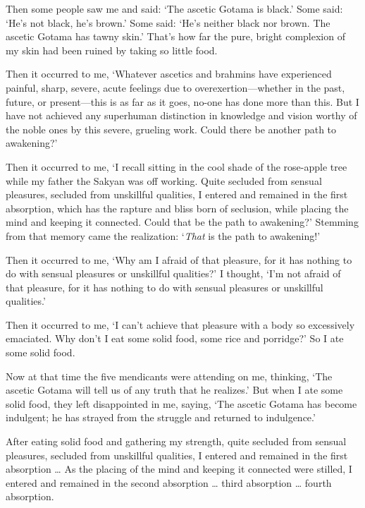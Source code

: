 \documentclass[12pt,openany]{book}%
\begin{document}
Then some people saw me and said: ‘The ascetic Gotama is black.’ Some said: ‘He’s not black, he’s brown.’ Some said: ‘He’s neither black nor brown. The ascetic Gotama has tawny skin.’ That’s how far the pure, bright complexion of my skin had been ruined by taking so little food. 

Then it occurred to me, ‘Whatever ascetics and brahmins have experienced painful, sharp, severe, acute feelings due to overexertion—whether in the past, future, or present—this is as far as it goes, no-one has done more than this. But I have not achieved any superhuman distinction in knowledge and vision worthy of the noble ones by this severe, grueling work. Could there be another path to awakening?’ 

Then it occurred to me, ‘I recall sitting in the cool shade of the rose-apple tree while my father the Sakyan was off working. Quite secluded from sensual pleasures, secluded from unskillful qualities, I entered and remained in the first absorption, which has the rapture and bliss born of seclusion, while placing the mind and keeping it connected. Could that be the path to awakening?’ Stemming from that memory came the realization: ‘\emph{That} is the path to awakening!’ 

Then it occurred to me, ‘Why am I afraid of that pleasure, for it has nothing to do with sensual pleasures or unskillful qualities?’ I thought, ‘I’m not afraid of that pleasure, for it has nothing to do with sensual pleasures or unskillful qualities.’ 

Then it occurred to me, ‘I can’t achieve that pleasure with a body so excessively emaciated. Why don’t I eat some solid food, some rice and porridge?’ So I ate some solid food. 

Now at that time the five mendicants were attending on me, thinking, ‘The ascetic Gotama will tell us of any truth that he realizes.’ But when I ate some solid food, they left disappointed in me, saying, ‘The ascetic Gotama has become indulgent; he has strayed from the struggle and returned to indulgence.’ 

After eating solid food and gathering my strength, quite secluded from sensual pleasures, secluded from unskillful qualities, I entered and remained in the first absorption … As the placing of the mind and keeping it connected were stilled, I entered and remained in the second absorption … third absorption … fourth absorption. 
\end{document}
